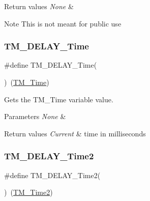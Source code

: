 \begin{DoxyRetVals}{Return values}
{\em None} & \\
\hline
\end{DoxyRetVals}
\begin{DoxyNote}{Note}
This is not meant for public use 
\end{DoxyNote}
\mbox{\label{group___t_m___d_e_l_a_y___functions_gaaf46291b088791f6b2025d327a810c16}} 
\subsubsection{\texorpdfstring{T\+M\+\_\+\+D\+E\+L\+A\+Y\+\_\+\+Time}{TM\_DELAY\_Time}}
{\footnotesize\ttfamily \#define T\+M\+\_\+\+D\+E\+L\+A\+Y\+\_\+\+Time(\begin{DoxyParamCaption}{ }\end{DoxyParamCaption})~(\hyperlink{group___t_m___d_e_l_a_y___variables_ga7c995255b1d6e58256f1b6e1db969000}{T\+M\+\_\+\+Time})}



Gets the T\+M\+\_\+\+Time variable value. 


\begin{DoxyParams}{Parameters}
{\em None} & \\
\hline
\end{DoxyParams}

\begin{DoxyRetVals}{Return values}
{\em Current} & time in milliseconds \\
\hline
\end{DoxyRetVals}
\mbox{\label{group___t_m___d_e_l_a_y___functions_ga5781218a9887f4883a311b52c11a7a59}} 
\subsubsection{\texorpdfstring{T\+M\+\_\+\+D\+E\+L\+A\+Y\+\_\+\+Time2}{TM\_DELAY\_Time2}}
{\footnotesize\ttfamily \#define T\+M\+\_\+\+D\+E\+L\+A\+Y\+\_\+\+Time2(\begin{DoxyParamCaption}{ }\end{DoxyParamCaption})~(\hyperlink{group___t_m___d_e_l_a_y___variables_ga7a35a6c16b0617fdea660d351139ecc7}{T\+M\+\_\+\+Time2})}



